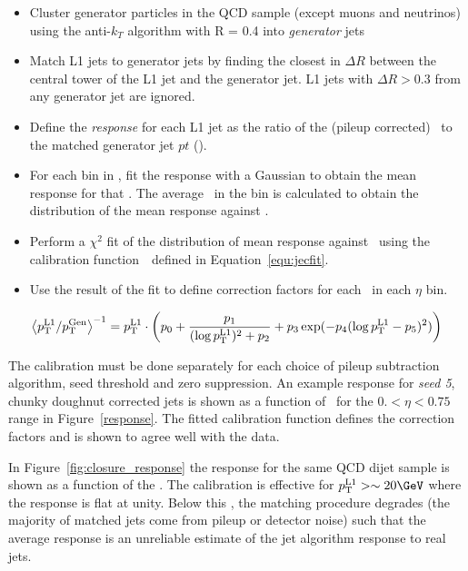 \begin{itemize}
\item Cluster generator particles in the QCD sample (except muons and neutrinos) using the anti-$k_T$ algorithm with R = 0.4 into \emph{generator} jets
\item Match L1 jets to generator jets by finding the closest in $\Delta R$ between the central tower of the L1 jet and the generator jet. L1 jets with 
$\Delta R > 0.3$ from any generator jet are ignored.
\item Define the \emph{response} for each L1 jet as the ratio of the (pileup corrected) \Lonept~to the matched generator jet $pt$ (\Genpt).
\item For each bin in \Genpt, fit the response with a Gaussian to obtain the mean response for that \Genpt. 
The average \Lonept~in the bin is calculated to obtain the distribution of the mean response against \Lonept.
\item Perform a $\chi^2$ fit of the distribution of mean response against \Lonept~using the calibration
 function~\cite{l1jet_calibration}~defined in Equation~\ref{equ:jecfit}.
\item Use the result of the fit to define correction factors for each \Lonept~in each $\eta$ bin.
\end{itemize}

\begin{equation}
\left<{p_{\text T}^{\text{L1}}}/{p_{\text T}^{\text{Gen}}}\right>^{-1} = {p_{\text T}^{\text{L1}}} \cdot \left ( p_{0} + 
\frac{p_{1}}{(\log {p_{\text T}^{\text{L1}}})^{2}+p_{2}}+p_{3} \exp(-p_{4}
(\log {p_{\text T}^{\text{L1}}}-p_{5} ) ^{2}) \right )
\label{equ:jecfit}
\end{equation}

The calibration must be done separately for each choice of pileup subtraction algorithm, seed threshold and zero suppression. 
An example response for \emph{seed 5}, chunky doughnut corrected jets is shown as a function of \Lonept~for 
the $0. < \eta < 0.75$ range in Figure~\ref{response}. The fitted calibration function defines the correction 
factors and is shown to agree well with the data.

In Figure~\ref{fig:closure_response} the response for the same QCD dijet sample is shown as a function of the \Lonept. The calibration
is effective for $\Lonept > \sim 20\GeV$ where the response is flat at unity. Below this \pt,
the matching procedure degrades (the majority of matched jets come from pileup or detector noise) 
such that the average response is an unreliable estimate of the jet algorithm response to real jets.

